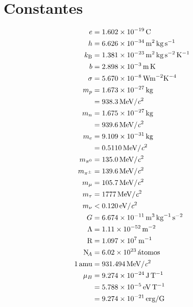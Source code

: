 \documentclass[10pt,twocolumn,titlepage]{article}
\newcommand{\boltz}{k_\textrm{B}}
\newcommand{\lspeed}{\textit{\textrm{c}}}
\newcommand{\Rydberg}{\textrm{R}}
\newcommand{\Avogadros}{\textrm{N}_{\!A}}
\newcommand{\atomos}{\acute{a}tomos}
\begin{document}
\section*{Constantes}
\begin{align*}
e&=\SI{1.602e-19}{\coulomb}\\
h&=\SI{6.626e-34}{\meter \squared \kg \per \second}\\
\boltz &=\SI{1.381e-23}{\meter \squared \kg \per \second \squared \per \kelvin }\\
b&=\SI{2.898e-3}{\meter \kelvin}\\
\sigma&=\SI{5.670e-8}{\watt \meter ^{-2} \kelvin ^{-4} }\\
m_p&=\SI{1.673e-27}{\kg}\\
    &=\SI{938.3}{\MeV/\lspeed ^2}\\
m_n&=\SI{1.675e-27}{\kg}\\
    &=\SI{939.6}{\MeV/\lspeed ^2}\\
m_e&=\SI{9.109e-31}{\kg}\\
    &=\SI{0.5110}{\MeV/\lspeed ^2}\\
m_{\pi^0}&=\SI{135.0}{\MeV/\lspeed ^2}\\
m_{\pi^{\pm}}&=\SI{139.6}{\MeV/\lspeed ^2}\\
m_{\mu}&=\SI{105.7}{\MeV/\lspeed ^2}\\
m_{\tau}&=\SI{1777}{\MeV/\lspeed ^2}\\
m_{\nu}&<\SI{0.120}{\eV/\lspeed ^2}\\
G  &=\SI{6.674e-11}{\meter \cubed \per \kilogram \per \second \squared}\\
\Lambda &= \SI{1.11e-52}{\per \meter \squared} \\
\Rydberg &=\SI{1.097e7}{\per \meter}  \\
\Avogadros &=\SI{6.02e23}{\atomos}\\
\SI{1}{amu}&=\SI{931.494}{\MeV/\lspeed^2}\\
\mu_B&=\SI{9.274e-24}{\joule \per \tesla}\\
&=\SI{5.788e-5}{\eV \per \tesla}\\
&=\SI{9.274e-21}{erg \per G}\\
\end{align*}

\end{document}
